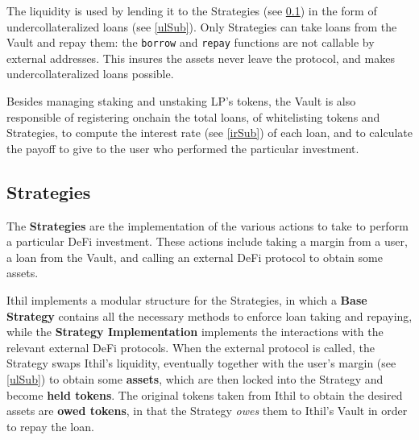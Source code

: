 \documentclass[a4paper,10 pt]{article}
\theoremstyle{definition}
\begin{document}
The liquidity is used by lending it to the Strategies (see \ref{stratSub}) in the form of undercollateralized loans (see \ref{ulSub}). Only Strategies can take loans from the Vault and repay them: the \verb|borrow| and \verb|repay| functions are not callable by external addresses. This insures the assets never leave the protocol, and makes undercollateralized loans possible.

Besides managing staking and unstaking LP's tokens, the Vault is also responsible of registering onchain the total loans, of whitelisting tokens and Strategies, to compute the interest rate (see \ref{irSub}) of each loan, and to calculate the payoff to give to the user who performed the particular investment.

\subsection{Strategies}\label{stratSub}

The {\bf Strategies} are the implementation of the various actions to take to perform a particular DeFi investment. These actions include taking a margin from a user, a loan from the Vault, and calling an external DeFi protocol to obtain some assets.

Ithil implements a modular structure for the Strategies, in which a {\bf Base Strategy} contains all the necessary methods to enforce loan taking and repaying, while the {\bf Strategy Implementation} implements the interactions with the relevant external DeFi protocols. When the external protocol is called, the Strategy swaps Ithil's liquidity, eventually together with the user's margin (see \ref{ulSub}) to obtain some {\bf assets}, which are then locked into the Strategy and become {\bf held tokens}. The original tokens taken from Ithil to obtain the desired assets are {\bf owed tokens}, in that the Strategy {\it owes} them to Ithil's Vault in order to repay the loan.
\end{document}
